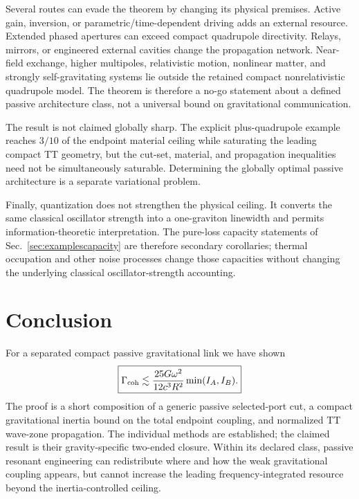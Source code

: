 Several routes can evade the theorem by changing its physical premises. Active gain, inversion, or parametric/time-dependent driving adds an external resource. Extended phased apertures can exceed compact quadrupole directivity. Relays, mirrors, or engineered external cavities change the propagation network. Near-field exchange, higher multipoles, relativistic motion, nonlinear matter, and strongly self-gravitating systems lie outside the retained compact nonrelativistic quadrupole model. The theorem is therefore a no-go statement about a defined passive architecture class, not a universal bound on gravitational communication.

The result is not claimed globally sharp. The explicit plus-quadrupole example reaches $3/10$ of the endpoint material ceiling while saturating the leading compact TT geometry, but the cut-set, material, and propagation inequalities need not be simultaneously saturable. Determining the globally optimal passive architecture is a separate variational problem.

Finally, quantization does not strengthen the physical ceiling. It converts the same classical oscillator strength into a one-graviton linewidth and permits information-theoretic interpretation. The pure-loss capacity statements of Sec.~\ref{sec:examplescapacity} are therefore secondary corollaries; thermal occupation and other noise processes change those capacities without changing the underlying classical oscillator-strength accounting.

\section{Conclusion}

For a separated compact passive gravitational link we have shown
\begin{equation}
\boxed{
\Gamma_{\rm coh}
\lesssim
\frac{25G\omega^2}{12c^3R^2}\min(I_A,I_B).}
\end{equation}
The proof is a short composition of a generic passive selected-port cut, a compact gravitational inertia bound on the total endpoint coupling, and normalized TT wave-zone propagation. The individual methods are established; the claimed result is their gravity-specific two-ended closure. Within its declared class, passive resonant engineering can redistribute where and how the weak gravitational coupling appears, but cannot increase the leading frequency-integrated resource beyond the inertia-controlled ceiling.